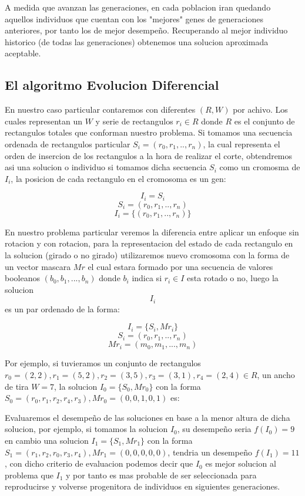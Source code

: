 \documentclass[10pt]{article}
\begin{document}
A medida que avanzan las generaciones, en cada poblacion iran quedando aquellos individuos que cuentan con los "mejores"  genes de generaciones anteriores, por tanto los de mejor desempeño. Recuperando al mejor individuo historico (de todas las generaciones) obtenemos una solucion aproximada aceptable.

\subsection{El algoritmo Evolucion Diferencial}

En nuestro caso particular contaremos con diferentes $(R,W)$ por achivo. Los cuales representan un $W$ y serie de rectangulos $r_i \in R$ donde $R$ es el conjunto de rectangulos totales que conforman nuestro problema. Si tomamos una secuencia ordenada de rectangulos particular $S_i = (r_0,r_1,..,r_n)$, la cual representa el orden de insercion de los rectangulos a la hora de realizar el corte, obtendremos asi una solucion o individuo si tomamos dicha secuencia $S_i$ como un cromosma de $I_i$, la posicion de cada rectangulo en el cromosoma es un gen:

$$I_i = S_i$$
$$S_i = (r_0,r_1,..,r_n)$$
$$I_i = \{(r_0,r_1,..,r_n)\}$$

En nuestro problema particular veremos la diferencia entre aplicar un enfoque sin rotacion y con rotacion, para la representacion del estado de cada rectangulo en la solucion (girado o no girado) utilizaremos nuevo cromosoma con la forma de un vector mascara $Mr$ el cual estara formado por una secuencia de valores booleanos $(b_0, b_1,...,b_n)$ donde $b_i$ indica si $r_i \in I$ esta rotado o no, luego la solucion $$I_i$$ es un par ordenado de la forma:

$$I_i = \{S_i,Mr_i\}$$
$$S_i = (r_0,r_1,..,r_n)$$
$$Mr_i = (m_0, m_1,...,m_n)$$


Por ejemplo, si tuvieramos un conjunto de rectangulos $r_0=(2,2),r_1=(5,2),r_2=(3,5), r_3 = (3,1), r_4=(2,4)\in R$, un ancho de tira $W = 7$, la solucion $I_0 = \{S_0,Mr_0\}$ con la forma $S_0 = (r_0,r_1,r_2,r_4,r_3), Mr_0 = (0,0,1,0,1)$ es:


Evaluaremos el desempeño de las soluciones en base a la menor altura de dicha solucion, por ejemplo, si tomamos la solucion $I_0$, su desempeño seria $f(I_0) = 9$ en cambio una solucion $I_1 = \{S_1,Mr_1\}$ con la forma $S_1 = (r_1,r_2,r_0,r_3,r_4), Mr_1 = (0,0,0,0,0)$, tendria un desempeño $f(I_1) = 11$, con dicho criterio de evaluacion podemos decir que $I_0$ es mejor solucion al problema que $I_1$ y por tanto es mas probable de ser seleccionada para reproducirse y volverse progenitora de individuos en siguientes generaciones.
\end{document}
